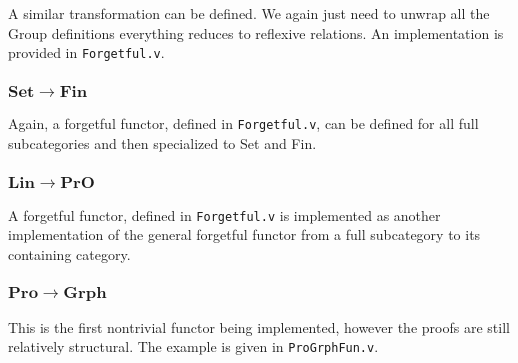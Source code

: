 \documentclass[12pt,twocolumn,oneside]{book}
\begin{document}
A similar transformation can be defined. We again just need to unwrap all the Group
definitions everything reduces to reflexive relations. An implementation is provided
in \texttt{Forgetful.v}.


\subsubsection{$\mathbf{Set} \to \mathbf{Fin}$}

Again, a forgetful functor, defined in \texttt{Forgetful.v}, can be defined for all full
subcategories and then specialized to Set and Fin.

\subsubsection{$\mathbf{Lin} \to \mathbf{PrO}$}

A forgetful functor, defined in \texttt{Forgetful.v} is implemented as another
implementation of the general forgetful functor from a full subcategory to its
containing category.

\subsubsection{$\mathbf{Pro} \to \mathbf{Grph}$}

This is the first nontrivial functor being implemented, however the proofs are
still relatively structural. The example is given in \texttt{ProGrphFun.v}.
\end{document}
